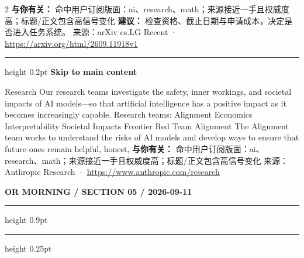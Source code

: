\documentclass[10.5pt]{ctexart}
\begin{document}
\begin{multicols}{2}
\textbf{与你有关：} 命中用户订阅版面：ai、research、math；来源接近一手且权威度高；标题/正文包含高信号变化
\textbf{建议：} 检查资格、截止日期与申请成本，决定是否进入任务系统。
{\footnotesize\color{ormuted} 来源：arXiv cs.LG Recent · \url{https://arxiv.org/html/2609.11918v1}}
\vspace{2mm}
\hrule height 0.2pt
\vspace{2mm}
{\large\bfseries Skip to main content}\par
Research Our research teams investigate the safety, inner workings, and societal impacts of AI models—so that artificial intelligence has a positive impact as it becomes increasingly capable. Research teams: Alignment Economics Interpretability Societal Impacts Frontier Red Team Alignment The Alignment team works to understand the risks of AI models and develop ways to ensure that future ones remain helpful, honest, 
\textbf{与你有关：} 命中用户订阅版面：ai、research、math；来源接近一手且权威度高；标题/正文包含高信号变化
{\footnotesize\color{ormuted} 来源：Anthropic Research · \url{https://www.anthropic.com/research}}
\end{multicols}
\newpage
{\small\bfseries OR MORNING / SECTION 05 / 2026-09-11}
\vspace{2mm}
\hrule height 0.9pt
\vspace{1.5mm}
\hrule height 0.25pt
\vspace{4mm}
\end{document}
